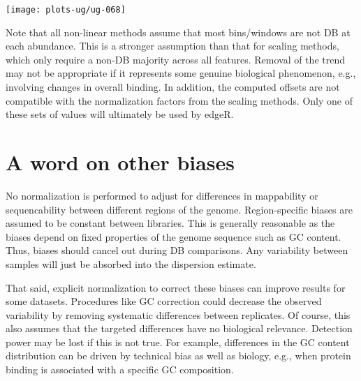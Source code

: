 \documentclass[12pt]{report}
\newcommand{\edger}{edgeR}
\begin{document}
\begin{center}
\texttt{[image: plots-ug/ug-068]}
\end{center}

Note that all non-linear methods assume that most bins/windows are not DB at each abundance. 
This is a stronger assumption than that for scaling methods, which only require a non-DB majority across all features.
Removal of the trend may not be appropriate if it represents some genuine biological phenomenon, e.g., involving changes in overall binding. 
In addition, the computed offsets are not compatible with the normalization factors from the scaling methods.
Only one of these sets of values will ultimately be used by \edger{}.


\section{A word on other biases}
No normalization is performed to adjust for differences in mappability or sequencability between different regions of the genome. 
Region-specific biases are assumed to be constant between libraries. 
This is generally reasonable as the biases depend on fixed properties of the genome sequence such as GC content. 
Thus, biases should cancel out during DB comparisons.
Any variability between samples will just be absorbed into the dispersion estimate. 

That said, explicit normalization to correct these biases can improve results for some datasets.
Procedures like GC correction could decrease the observed variability by removing systematic differences between replicates. 
Of course, this also assumes that the targeted differences have no biological relevance.
Detection power may be lost if this is not true. 
For example, differences in the GC content distribution can be driven by technical bias as well as biology, e.g., when protein binding is associated with a specific GC composition.


\end{document}
